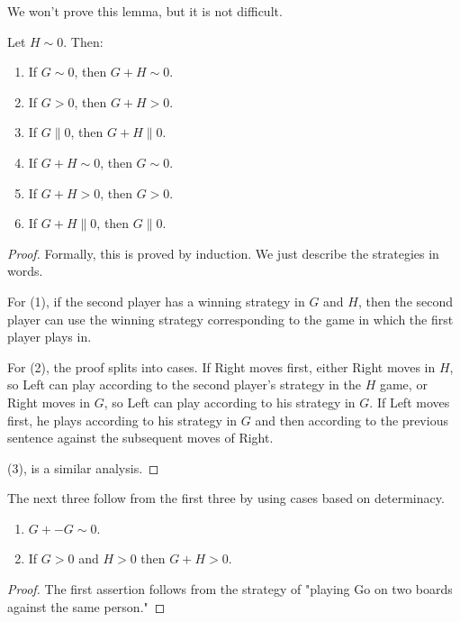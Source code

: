 We won't prove this lemma, but it is not difficult.

\begin{lemma} %
Let $H\sim 0$. Then:
\begin{enumerate}
  \item  If $G\sim 0$, then $G+H\sim 0$.
  \item  If $G>0$, then $G+H>0$.
  \item  If $G\parallel 0$, then $G+H\parallel 0$.
  \item  If $G+H\sim 0$, then $G\sim 0$.
  \item  If $G+H>0$, then $G>0$.
  \item  If $G+H\parallel 0$, then $G\parallel 0$.
\end{enumerate}
 \end{lemma}

\begin{proof} %

Formally, this is proved by induction. We just describe the strategies in words.

For (1), if the second player has a winning strategy in $G$ and $H$, then the second player can use the winning strategy corresponding to the game in which the first player plays in.

For (2), the proof splits into cases. If Right moves first, either Right moves in $H$, so Left can play according to the second player's strategy in the $H$ game, or Right moves in $G$, so Left can play according to his strategy in $G$. If Left moves first, he plays according to his strategy in $G$ and then according to the previous sentence against the subsequent moves of Right.

(3), is a similar analysis.
 \end{proof}

The next three follow from the first three by using cases based on determinacy.

\begin{lemma} %
\begin{enumerate}
  \item  $G+ -G\sim 0$.
  \item  If $G>0$ and $H>0$ then $G+H>0$.
\end{enumerate}
 \end{lemma}

\begin{proof} %

The first assertion follows from the strategy of "playing Go on two boards against the same person."
 \end{proof}

